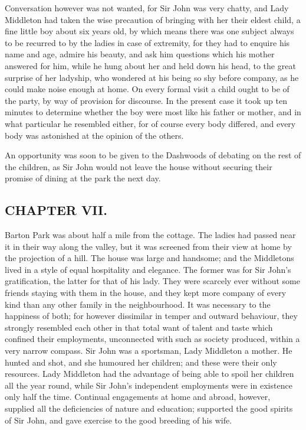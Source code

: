 Conversation however was not wanted, for Sir John was very chatty, and Lady Middleton had taken the wise precaution of bringing with her their eldest child, a fine little boy about six years old, by which means there was one subject always to be recurred to by the ladies in case of extremity, for they had to enquire his name and age, admire his beauty, and ask him questions which his mother answered for him, while he hung about her and held down his head, to the great surprise of her ladyship, who wondered at his being so shy before company, as he could make noise enough at home. On every formal visit a child ought to be of the party, by way of provision for discourse. In the present case it took up ten minutes to determine whether the boy were most like his father or mother, and in what particular he resembled either, for of course every body differed, and every body was astonished at the opinion of the others.

An opportunity was soon to be given to the Dashwoods of debating on the rest of the children, as Sir John would not leave the house without securing their promise of dining at the park the next day.

\subsection[chapter-vii.]{\useURL[url7][][][]\from[url7]CHAPTER VII.}

Barton Park was about half a mile from the cottage. The ladies had passed near it in their way along the valley, but it was screened from their view at home by the projection of a hill. The house was large and handsome; and the Middletons lived in a style of equal hospitality and elegance. The former was for Sir John's gratification, the latter for that of his lady. They were scarcely ever without some friends staying with them in the house, and they kept more company of every kind than any other family in the neighbourhood. It was necessary to the happiness of both; for however dissimilar in temper and outward behaviour, they strongly resembled each other in that total want of talent and taste which confined their employments, unconnected with such as society produced, within a very narrow compass. Sir John was a sportsman, Lady Middleton a mother. He hunted and shot, and she humoured her children; and these were their only resources. Lady Middleton had the advantage of being able to spoil her children all the year round, while Sir John's independent employments were in existence only half the time. Continual engagements at home and abroad, however, supplied all the deficiencies of nature and education; supported the good spirits of Sir John, and gave exercise to the good breeding of his wife.

